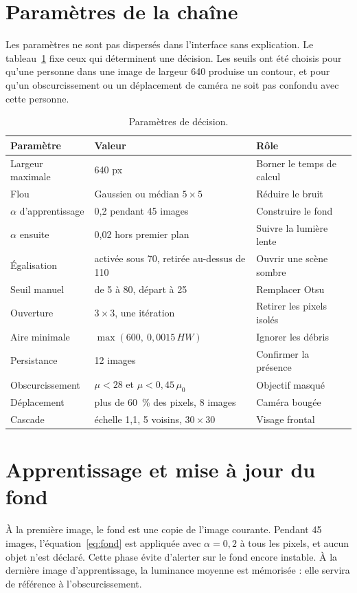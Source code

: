 \section{Paramètres de la chaîne}

Les paramètres ne sont pas dispersés dans l'interface sans explication. Le tableau~\ref{tab:params} fixe ceux qui déterminent une décision. Les seuils ont été choisis pour qu'une personne dans une image de largeur 640 produise un contour, et pour qu'un obscurcissement ou un déplacement de caméra ne soit pas confondu avec cette personne.

\begin{table}[ht]
\centering
\caption{Paramètres de décision.}
\label{tab:params}
\small
\begin{tabular}{@{}llp{5.5cm}@{}}
\toprule
Paramètre & Valeur & Rôle \\
\midrule
Largeur maximale & 640 px & Borner le temps de calcul \\
Flou & Gaussien ou médian $5\times 5$ & Réduire le bruit \\
$\alpha$ d'apprentissage & 0{,}2 pendant 45 images & Construire le fond \\
$\alpha$ ensuite & 0{,}02 hors premier plan & Suivre la lumière lente \\
Égalisation & activée sous 70, retirée au-dessus de 110 & Ouvrir une scène sombre \\
Seuil manuel & de 5 à 80, départ à 25 & Remplacer Otsu \\
Ouverture & $3\times 3$, une itération & Retirer les pixels isolés \\
Aire minimale & $\max(600,\ 0{,}0015\,HW)$ & Ignorer les débris \\
Persistance & 12 images & Confirmer la présence \\
Obscurcissement & $\mu<28$ et $\mu<0{,}45\,\mu_0$ & Objectif masqué \\
Déplacement & plus de 60~\% des pixels, 8 images & Caméra bougée \\
Cascade & échelle 1{,}1, 5 voisins, $30\times 30$ & Visage frontal \\
\bottomrule
\end{tabular}
\end{table}

\section{Apprentissage et mise à jour du fond}

À la première image, le fond est une copie de l'image courante. Pendant 45 images, l'équation~\eqref{eq:fond} est appliquée avec $\alpha = 0{,}2$ à tous les pixels, et aucun objet n'est déclaré. Cette phase évite d'alerter sur le fond encore instable. À la dernière image d'apprentissage, la luminance moyenne est mémorisée : elle servira de référence à l'obscurcissement.

